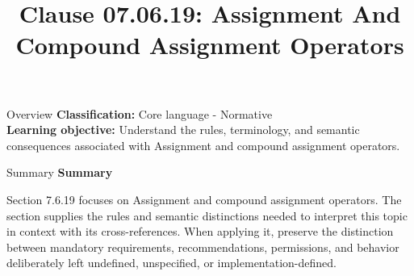 \documentclass[10pt,letterpaper]{article}
\title{Clause 07.06.19: Assignment And Compound Assignment Operators}
\author{}
\date{}
\begin{document}
\maketitle
\begin{CornellOverviewBox}{Overview}
\textbf{Classification:} Core language - Normative\\[2pt]
\textbf{Learning objective:} Understand the rules, terminology, and semantic consequences associated with Assignment and compound assignment operators.
\end{CornellOverviewBox}\begin{CornellSummaryBox}{Summary}
{\sffamily\bfseries\color{Accent} Summary}\par\vspace{3pt}Section 7.6.19 focuses on Assignment and compound assignment operators. The section supplies the rules and semantic distinctions needed to interpret this topic in context with its cross-references. When applying it, preserve the distinction between mandatory requirements, recommendations, permissions, and behavior deliberately left undefined, unspecified, or implementation-defined.
\end{CornellSummaryBox}
\end{document}
